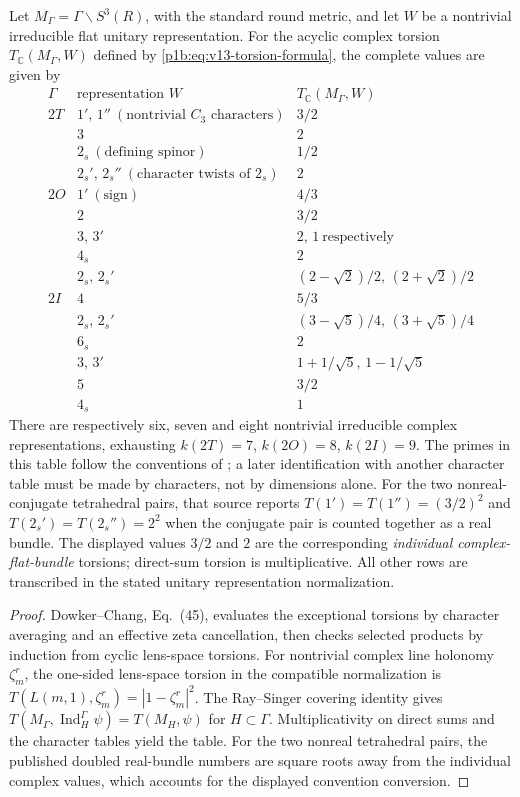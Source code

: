 \documentclass[11pt]{article}
\begin{document}
\begin{theorem}
\label{p1b:thm:v15-exceptional-torsion-table}
Let $M_\Gamma=\Gamma\backslash S^3(R)$, with the standard round metric,
and let $W$ be a nontrivial irreducible flat unitary representation.
For the acyclic complex torsion $T_{\mathbb C}(M_\Gamma,W)$ defined
by \eqref{p1b:eq:v13-torsion-formula}, the complete values are given by
\[
\begin{array}{c|l|c}
 \Gamma&\text{representation }W& T_{\mathbb C}(M_\Gamma,W)\\\hline
 2T&1',\,1''\ (\text{nontrivial }C_3\text{ characters})&3/2\\
   &3&2\\
   &2_s\ (\text{defining spinor})&1/2\\
   &2_s',\,2_s''\ (\text{character twists of }2_s)&2\\\hline
 2O&1'\ (\text{sign})&4/3\\
   &2&3/2\\
   &3,\,3'&2,\,1\ \text{respectively}\\
   &4_s&2\\
   &2_s,\,2_s'&(2-\sqrt2)/2,\,(2+\sqrt2)/2\\\hline
 2I&4&5/3\\
   &2_s,\,2_s'&(3-\sqrt5)/4,\,(3+\sqrt5)/4\\
   &6_s&2\\
   &3,\,3'&1+1/\sqrt5,\,1-1/\sqrt5\\
   &5&3/2\\
   &4_s&1
\end{array}
\tag{T15.1}\label{p1b:eq:v15-torsion-table}
\]
There are respectively six, seven and eight nontrivial irreducible
complex representations, exhausting $k(2T)=7$, $k(2O)=8$, $k(2I)=9$.
The primes in this table follow the conventions of
\cite{DowkerChang2009AnalyticTorsion}; a later identification with another
character table must be made by characters, not by dimensions alone.
For the two nonreal-conjugate tetrahedral pairs, that source reports
$T(1')=T(1'')=(3/2)^2$ and $T(2_s')=T(2_s'')=2^2$
when the conjugate pair is counted together as a real bundle.
The displayed values $3/2$ and $2$ are the corresponding
\emph{individual complex-flat-bundle} torsions; direct-sum torsion is
multiplicative. All other rows are transcribed in the stated unitary
representation normalization.
\end{theorem}
\begin{proof}
Dowker--Chang, Eq.~(45), evaluates the exceptional torsions by
character averaging and an effective zeta cancellation, then checks
selected products by induction from cyclic lens-space torsions.
For nontrivial complex line holonomy $\zeta_m^r$, the one-sided lens-space
torsion in the compatible normalization is
$T(L(m,1),\zeta_m^r)=|1-\zeta_m^r|^2$.
The Ray--Singer covering identity gives
$T(M_\Gamma,\operatorname{Ind}_H^\Gamma\psi)
 =T(M_H,\psi)$ for $H\subset\Gamma$.
Multiplicativity on direct sums and the character tables yield the table.
For the two nonreal tetrahedral pairs, the published doubled real-bundle
numbers are square roots away from the individual complex values,
which accounts for the displayed convention conversion.
\end{proof}
\end{document}
